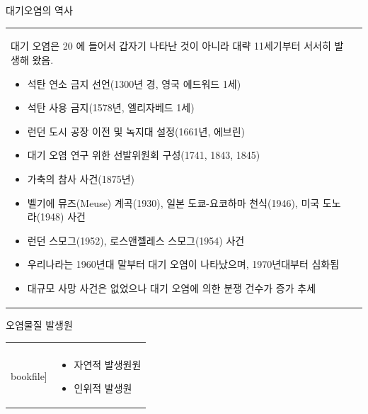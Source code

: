 \begin{frame}[t]{대기오염의 역사}
	\begin{tabular}{ll}
		\begin{minipage}[t]{0.94\textwidth}\scriptsize
			대기 오염은 20 에 들어서 갑자기 나타난 것이 아니라 대략 11세기부터 서서히 발생해 왔음.
			\begin{itemize}
				\item 석탄 연소 금지 선언(1300년 경, 영국 에드워드 1세)
				\item 석탄 사용 금지(1578년, 엘리자베드 1세)
				\item 런던 도시 공장 이전 및 녹지대 설정(1661년, 에브린)
				\item 대기 오염 연구 위한 선발위원회 구성(1741, 1843, 1845)
				\item 가축의 참사 사건(1875년)
				\item 벨기에 뮤즈(Meuse) 계곡(1930), 일본 도쿄-요코하마 천식(1946), 미국 도노라(1948) 사건
				\item 런던 스모그(1952), 로스앤젤레스 스모그(1954) 사건

				\item 우리나라는 1960년대 말부터 대기 오염이 나타났으며, 1970년대부터 심화됨
				\item 대규모 사망 사건은 없었으나 대기 오염에 의한 분쟁 건수가 증가 추세
				
			\end{itemize}

		\end{minipage}	
		&
		\begin{minipage}[t]{0.01\textwidth} \scriptsize	
			
		\end{minipage}
	\end{tabular}
\end{frame}



\begin{frame}[t]{오염물질 발생원}
	\begin{tabular}{ll}
		\begin{minipage}[t]{0.55\textwidth}\scriptsize
			\begin{figure}[t]
				\texttt{[image: \\bookfile]}
			\end{figure}
		\end{minipage}	
		&
		\begin{minipage}[t]{0.4\textwidth} \scriptsize	
			\begin{itemize}
				\item 자연적 발생원원
				\item 인위적 발생원
			\end{itemize}


		\end{minipage}
	\end{tabular}
\end{frame}



